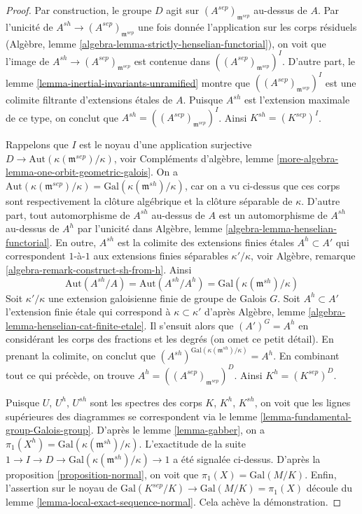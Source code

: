 \begin{proof}
Par construction, le groupe $D$ agit sur $(A^{sep})_{\mathfrak m^{sep}}$
au-dessus de $A$. Par l'unicité de $A^{sh} \to (A^{sep})_{\mathfrak m^{sep}}$
une fois donnée l'application sur les corps résiduels
(Algèbre, lemme \ref{algebra-lemma-strictly-henselian-functorial}),
on voit que l'image de $A^{sh} \to (A^{sep})_{\mathfrak m^{sep}}$
est contenue dans $((A^{sep})_{\mathfrak m^{sep}})^I$.
D'autre part, le
lemme \ref{lemma-inertial-invariants-unramified}
montre que $((A^{sep})_{\mathfrak m^{sep}})^I$
est une colimite filtrante d'extensions étales de $A$.
Puisque $A^{sh}$ est l'extension maximale de ce type, on conclut
que $A^{sh} = ((A^{sep})_{\mathfrak m^{sep}})^I$.
Ainsi $K^{sh} = (K^{sep})^I$.

\medskip\noindent
Rappelons que $I$ est le noyau d'une application surjective
$D \to \text{Aut}(\kappa(\mathfrak m^{sep})/\kappa)$, voir
Compléments d'algèbre, lemme \ref{more-algebra-lemma-one-orbit-geometric-galois}.
On a $\text{Aut}(\kappa(\mathfrak m^{sep})/\kappa) =
\text{Gal}(\kappa(\mathfrak m^{sh})/\kappa)$,
car on a vu ci-dessus que ces corps sont respectivement la clôture algébrique
et la clôture séparable de $\kappa$.
D'autre part, tout automorphisme de $A^{sh}$ au-dessus de $A$
est un automorphisme de $A^{sh}$ au-dessus de $A^h$ par l'unicité
dans Algèbre, lemme \ref{algebra-lemma-henselian-functorial}.
En outre, $A^{sh}$ est la colimite des extensions finies étales
$A^h \subset A'$ qui correspondent $1$-à-$1$
aux extensions finies séparables $\kappa'/\kappa$, voir
Algèbre, remarque \ref{algebra-remark-construct-sh-from-h}.
Ainsi
$$
\text{Aut}(A^{sh}/A) = \text{Aut}(A^{sh}/A^h) =
\text{Gal}(\kappa(\mathfrak m^{sh})/\kappa)
$$
Soit $\kappa'/\kappa$ une extension galoisienne finie de
groupe de Galois $G$. Soit $A^h \subset A'$ l'extension finie étale
qui correspond à $\kappa \subset \kappa'$ d'après
Algèbre, lemme \ref{algebra-lemma-henselian-cat-finite-etale}.
Il s'ensuit alors que
$(A')^G = A^h$ en considérant les corps des fractions et les degrés
(on omet ce petit détail). En prenant la colimite, on conclut que
$(A^{sh})^{\text{Gal}(\kappa(\mathfrak m^{sh})/\kappa)} = A^h$.
En combinant tout ce qui précède, on trouve $A^h = ((A^{sep})_{\mathfrak m^{sep}})^D$.
Ainsi $K^h = (K^{sep})^D$.

\medskip\noindent
Puisque $U$, $U^h$, $U^{sh}$ sont les spectres des corps
$K$, $K^h$, $K^{sh}$, on voit que les lignes supérieures des diagrammes
se correspondent via le
lemme \ref{lemma-fundamental-group-Galois-group}.
D'après le lemme \ref{lemma-gabber}, on a
$\pi_1(X^h) = \text{Gal}(\kappa(\mathfrak m^{sh})/\kappa)$.
L'exactitude de la suite
$1 \to I \to D \to \text{Gal}(\kappa(\mathfrak m^{sh})/\kappa) \to 1$
a été signalée ci-dessus.
D'après la proposition \ref{proposition-normal},
on voit que $\pi_1(X) = \text{Gal}(M/K)$.
Enfin, l'assertion sur le noyau de
$\text{Gal}(K^{sep}/K) \to \text{Gal}(M/K) = \pi_1(X)$
découle du lemme \ref{lemma-local-exact-sequence-normal}.
Cela achève la démonstration.
\end{proof}

